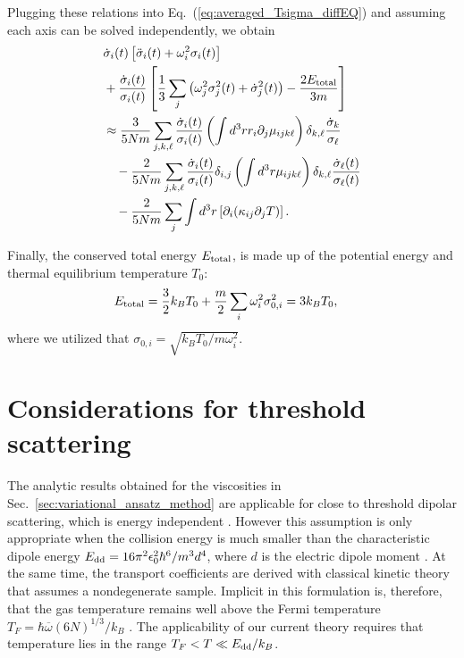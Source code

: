 \documentclass[reprint, amsmath, amssymb, aps, superscriptaddress]{revtex4-1}
\begin{document}
Plugging these relations into Eq.~(\ref{eq:averaged_Tsigma_diffEQ}) and assuming each axis can be solved independently, we obtain 
\begin{align} \label{eq:sigmas_EOM_unsimplified}
    & \dot{\sigma}_i(t) 
    \left[
    \ddot{\sigma}_i(t)
    +
    \omega_i^2 \sigma_i(t) 
    \right] \nonumber\\
    & + 
    \frac{ \dot{\sigma}_i(t) }{ \sigma_i(t) }
    \left[
    \frac{ 1 }{ 3 }
    \sum_j 
    \left(
    \omega_j^2 \sigma_j^2(t) 
    +
    \dot{\sigma}_j^2(t)
    \right)
    -
    \frac{ 2 E_{\rm total} }{ 3 m }
    \right] \nonumber\\
    &\approx 
    \frac{ 3 }{ 5 N m }
    \sum_{j, k, \ell} 
    \frac{ \dot{\sigma}_i(t) }{ \sigma_i(t) }
    \left( \int d^3 r r_i \partial_j \mu_{i j k \ell} \right)
    \delta_{k, \ell} 
    \frac{ \dot{\sigma}_k }{ \sigma_{\ell} } \nonumber\\
    &\quad -
    \frac{ 2 }{ 5 N m }
    \sum_{j, k, \ell} 
    \frac{ \dot{\sigma}_i(t) }{ \sigma_i(t) }
    \delta_{ i, j }
    \left( \int d^3 r \mu_{i j k \ell} \right)
    \delta_{ k, \ell }
    \frac{ \dot{\sigma}_{\ell}(t) }{ \sigma_{\ell}(t) } \nonumber\\
    &\quad -
    \frac{ 2 }{ 5 N m }
    \sum_{j}
    \int d^3 r \left[ \partial_i ( \kappa_{i j} \partial_j T ) \right].
\end{align}

Finally, the conserved total energy $E_{\rm total}$, is made up of the potential energy and thermal equilibrium temperature $T_0$:
\begin{align} \label{eq:total_energy_relation}
    E_{\rm total}
    &=
    \frac{ 3 }{ 2 } k_B T_0
    +
    \frac{m}{2}
    \sum_i
    \omega_i^2 \sigma_{0,i}^2
    =
    3 k_B T_0,
\end{align}
where we utilized that $\sigma_{0,i} = \sqrt{ { k_B T_0 / m \omega_i^2 } }$.




\section{ Considerations for threshold scattering \label{app:threshold_consideration} }

The analytic results obtained for the viscosities in Sec.~\ref{sec:variational_ansatz_method} are applicable for close to threshold dipolar scattering, which is energy independent \cite{Bohn14_PRA}. However this assumption is only appropriate when the collision energy is much smaller than the characteristic dipole energy $E_{\rm dd} = 16 \pi^2 \epsilon_0^2 \hbar^6 / m^3 d^4$, where $d$ is the electric dipole moment \cite{Bohn09_NJP}. At the same time, the transport coefficients are derived with classical kinetic theory that assumes a nondegenerate sample. Implicit in this formulation is, therefore, that the gas temperature remains well above the Fermi temperature $T_F = \hbar \overline{\omega} (6 N)^{1/3} / k_B$ \cite{Butts97_PRA}. The applicability of our current theory requires that temperature lies in the range $T_F < T \ll E_{\rm dd} / k_B$. 
\end{document}
